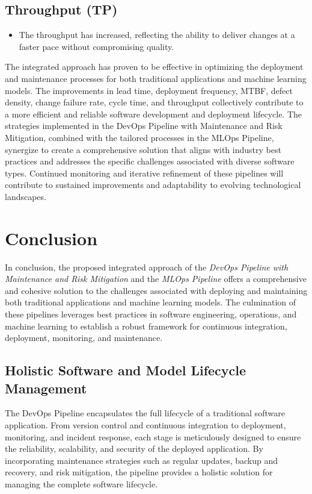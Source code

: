 \documentclass[12pt, letterpaper]{article}
\begin{document}
\subsection*{Throughput (TP)}

\begin{itemize}
    \item The throughput has increased, reflecting the ability to deliver changes at a faster pace without compromising quality.
\end{itemize}



The integrated approach has proven to be effective in optimizing the deployment and maintenance processes for both traditional applications and machine learning models. The improvements in lead time, deployment frequency, MTBF, defect density, change failure rate, cycle time, and throughput collectively contribute to a more efficient and reliable software development and deployment lifecycle. The strategies implemented in the DevOps Pipeline with Maintenance and Risk Mitigation, combined with the tailored processes in the MLOps Pipeline, synergize to create a comprehensive solution that aligns with industry best practices and addresses the specific challenges associated with diverse software types. Continued monitoring and iterative refinement of these pipelines will contribute to sustained improvements and adaptability to evolving technological landscapes.

\section{Conclusion}

In conclusion, the proposed integrated approach of the \textit{DevOps Pipeline with Maintenance and Risk Mitigation} and the \textit{MLOps Pipeline} offers a comprehensive and cohesive solution to the challenges associated with deploying and maintaining both traditional applications and machine learning models. The culmination of these pipelines leverages best practices in software engineering, operations, and machine learning to establish a robust framework for continuous integration, deployment, monitoring, and maintenance.

\subsection{Holistic Software and Model Lifecycle Management}

The DevOps Pipeline encapsulates the full lifecycle of a traditional software application. From version control and continuous integration to deployment, monitoring, and incident response, each stage is meticulously designed to ensure the reliability, scalability, and security of the deployed application. By incorporating maintenance strategies such as regular updates, backup and recovery, and risk mitigation, the pipeline provides a holistic solution for managing the complete software lifecycle.
\end{document}
